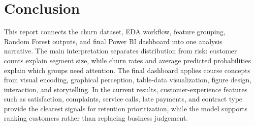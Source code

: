 \section{Conclusion}
This report connects the churn dataset, EDA workflow, feature grouping, Random
Forest outputs, and final Power BI dashboard into one analysis narrative. The
main interpretation separates distribution from risk: customer counts explain
segment size, while churn rates and average predicted probabilities explain
which groups need attention. The final dashboard applies course concepts from
visual encoding, graphical perception, table-data visualization, figure design,
interaction, and storytelling. In the current results, customer-experience
features such as satisfaction, complaints, service calls, late payments, and
contract type provide the clearest signals for retention prioritization, while
the model supports ranking customers rather than replacing business judgement.
